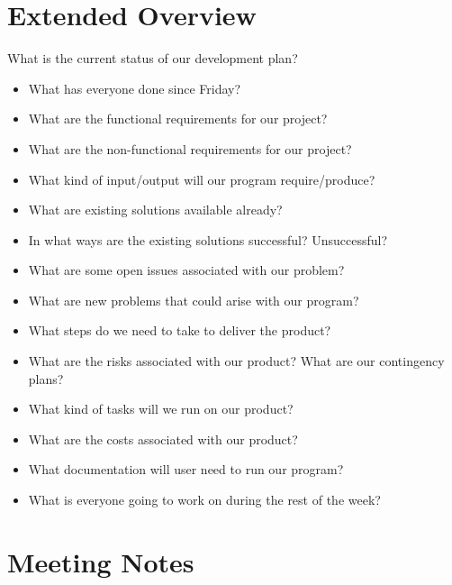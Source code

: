 \documentclass[11pt]{meetingmins}
\begin{document}
\section{Extended Overview}
\begin{hiddenitems}
\item
What is the current status of our development plan?
\begin{itemize}
	\item{What has everyone done since Friday?}
	
	\item{What are the functional requirements for our project?}
	
	\item{What are the non-functional requirements for our project?}
	
	\item{What kind of input/output will our program require/produce?}	
	
	\item{What are existing solutions available already?}
	
	\item{In what ways are the existing solutions successful? Unsuccessful?}
	
	\item{What are some open issues associated with our problem?}
	
	\item{What are new problems that could arise with our program?}
	
	\item{What steps do we need to take to deliver the product?}
	
	\item{What are the risks associated with our product? What are our contingency 
plans?}

	\item{What kind of tasks will we run on our product?}
	
	
	\item{What are the costs associated with our product?}
	
	\item{What documentation will user need to run our program?}
	
	\item{What is everyone going to work on during the rest of the week?}
\end{itemize}

\end{hiddenitems}

\section{Meeting Notes}
\end{document}
